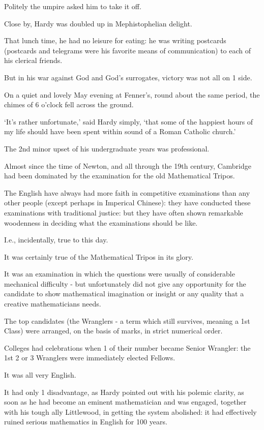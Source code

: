 \documentclass{article}
\numberwithin{equation}{section}
\begin{document}
Politely the umpire asked him to take it off.

Close by, Hardy was doubled up in Mephistophelian delight.

That lunch time, he had no leisure for eating: he was writing postcards (postcards and telegrams were his favorite means of communication) to each of his clerical friends.

%
But in his war against God and God's surrogates, victory was not all on 1 side.

On a quiet and lovely May evening at Fenner's, round about the same period, the chimes of 6 o'clock fell across the ground.

`It's rather unfortunate,' said Hardy simply, `that some of the happiest hours of my life should have been spent within sound of a Roman Catholic church.'

%
The 2nd minor upset of his undergraduate years was professional.

Almost since the time of Newton, and all through the 19th century, Cambridge had been dominated by the examination for the old Mathematical Tripos.

The English have always had more faith in competitive examinations than any other people (except perhaps in Imperical Chinese): they have conducted these examinations with traditional justice: but they have often shown remarkable woodenness in deciding what the examinations should be like.

I.e., incidentally, true to this day.

It was certainly true of the Mathematical Tripos in its glory.

It was an examination in which the questions were usually of considerable mechanical difficulty - but unfortunately did not give any opportunity for the candidate to show mathematical imagination or insight or any quality that a creative mathematicians needs.

The top candidates (the Wranglers - a term which still survives, meaning a 1st Class) were arranged, on the basis of marks, in strict numerical order.

Colleges had celebrations when 1 of their number became Senior Wrangler: the 1st 2 or 3 Wranglers were immediately elected Fellows.

%
It was all very English.

It had only 1 disadvantage, as Hardy pointed out with his polemic clarity, as soon as he had become an eminent mathematician and was engaged, together with his tough ally Littlewood, in getting the system abolished: it had effectively ruined serious mathematics in English for 100 years.
\end{document}
